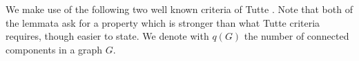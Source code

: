 \documentclass[11pt]{article}
\begin{document}

  


We make use of the following two well known criteria of Tutte \cite{tutte1952factors, tutte1947factorization}. Note that both of the lemmata ask for a property which is stronger than what Tutte criteria requires, though easier to state. We denote with $q(G)$ the number of connected components in a graph $G$.
\end{document}
